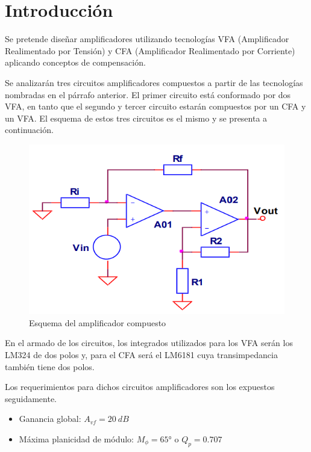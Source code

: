 \section{Introducción}
\hspace{1mm} Se pretende diseñar amplificadores utilizando tecnologías VFA (Amplificador Realimentado por Tensión) y CFA (Amplificador Realimentado por Corriente) aplicando conceptos de compensación.

\bigskip
\hspace{1mm} Se analizarán tres circuitos amplificadores compuestos a partir de las tecnologías nombradas en el párrafo anterior. El primer circuito está conformado por dos VFA, en tanto que el segundo y tercer circuito estarán compuestos por un CFA y un VFA. El esquema de estos tres circuitos es el mismo y se presenta a continuación.

\begin{figure}[!h]
    \centering
    \includegraphics[scale=0.7]{img/Objetivos.png}
    \caption{Esquema del amplificador compuesto}
\end{figure}

\hspace{1mm} En el armado de los circuitos, los integrados utilizados para los VFA serán los LM324 de dos polos y, para el CFA será el LM6181 cuya transimpedancia también tiene dos polos. 

\bigskip
\hspace{1mm} Los requerimientos para dichos circuitos amplificadores son los expuestos seguidamente.
\begin{itemize}
    \item Ganancia global: \(A_{vf} = 20~dB\)
    \item Máxima planicidad de módulo: \(M_{\phi}=65°\) o \(Q_p=0.707\)
\end{itemize}


